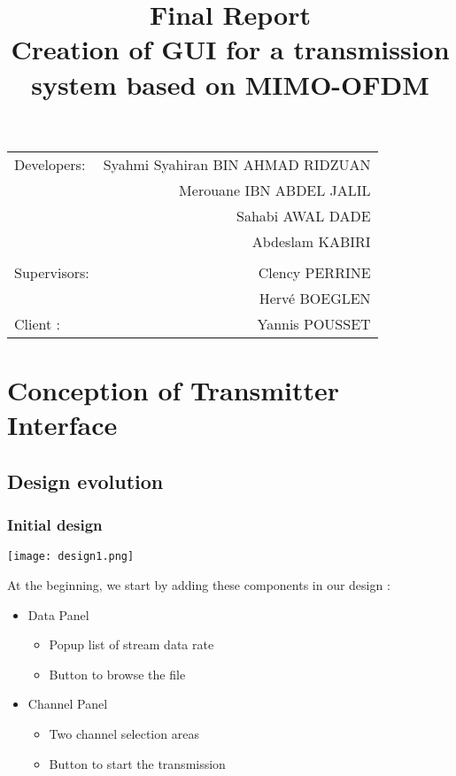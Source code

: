 \documentclass[12pt,a4paper]{article}
\begin{document}
\title{\textbf {\huge Final Report\\ Creation of GUI for a transmission system based on MIMO-OFDM}}
\maketitle

\begin{center}
\begin{tabular}{l r}
 
Developers: & Syahmi Syahiran BIN AHMAD RIDZUAN \\
& Merouane IBN ABDEL JALIL \\
& Sahabi AWAL DADE \\ 
& Abdeslam KABIRI\\ %
\\
Supervisors: &  Clency PERRINE \\ 
& Herv\'e BOEGLEN \\ %
Client : & Yannis POUSSET \\	
\end{tabular}
\end{center}

\clearpage

\section{Conception of Transmitter Interface}
\subsection{Design evolution}
\subsubsection{Initial design}
\begin{center}
\texttt{[image: design1.png]}
\end{center}
\par At the beginning, we start by adding these components in our design :
\begin{itemize}
	\item Data Panel
	\begin{itemize}
		\item Popup list of stream data rate 
		\item Button to browse the file
	\end{itemize}
	\item Channel Panel
	\begin{itemize}
		\item Two channel selection areas 
		\item Button to start the transmission
	\end{itemize}
\end{itemize}
\end{document}

